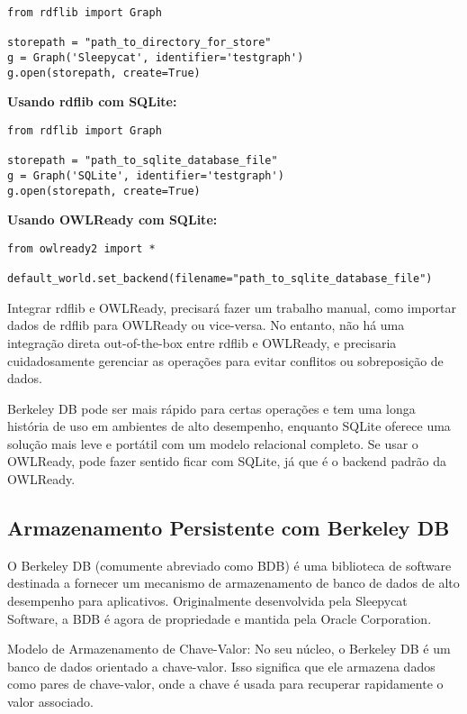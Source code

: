 \begin{verbatim}
from rdflib import Graph

storepath = "path_to_directory_for_store"
g = Graph('Sleepycat', identifier='testgraph')
g.open(storepath, create=True)
\end{verbatim}

\textbf{Usando rdflib com SQLite:}

\begin{verbatim}
from rdflib import Graph

storepath = "path_to_sqlite_database_file"
g = Graph('SQLite', identifier='testgraph')
g.open(storepath, create=True)
\end{verbatim}

\textbf{Usando OWLReady com SQLite:}

\begin{verbatim}
from owlready2 import *

default_world.set_backend(filename="path_to_sqlite_database_file")
\end{verbatim}

Integrar rdflib e OWLReady, precisará fazer um trabalho manual, como importar dados de rdflib para OWLReady ou vice-versa. No entanto, não há uma integração direta out-of-the-box entre rdflib e OWLReady, e precisaria cuidadosamente gerenciar as operações para evitar conflitos ou sobreposição de dados.

Berkeley DB pode ser mais rápido para certas operações e tem uma longa história de uso em ambientes de alto desempenho, enquanto SQLite oferece uma solução mais leve e portátil com um modelo relacional completo. Se usar o OWLReady, pode fazer sentido ficar com SQLite, já que é o backend padrão da OWLReady.

\subsection{Armazenamento Persistente com Berkeley DB}

O Berkeley DB (comumente abreviado como BDB) é uma biblioteca de software destinada a fornecer um mecanismo de armazenamento de banco de dados de alto desempenho para aplicativos. Originalmente desenvolvida pela Sleepycat Software, a BDB é agora de propriedade e mantida pela Oracle Corporation.

Modelo de Armazenamento de Chave-Valor: No seu núcleo, o Berkeley DB é um banco de dados orientado a chave-valor. Isso significa que ele armazena dados como pares de chave-valor, onde a chave é usada para recuperar rapidamente o valor associado.

